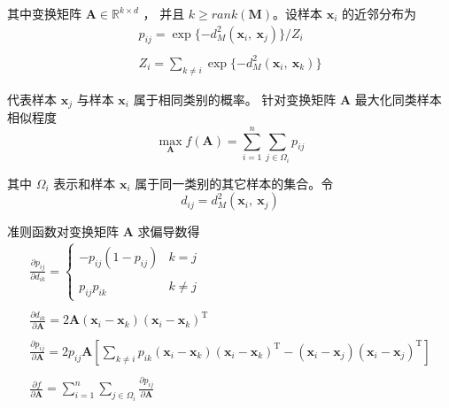 \documentclass[notitlepage]{article}
\begin{document}
其中变换矩阵 $\mathbf{A} \in \mathbb{R}^{k \times d}$ ，
并且 $k \ge rank(\mathbf{M})$。设样本 $\boldsymbol{x}_{i}$ 的近邻分布为
\begin{gather*}
    p_{ij} = \exp\{-d^{2}_{M}(\boldsymbol{x}_{i},\ 
    \boldsymbol{x}_{j})\} \bigg/ Z_{i} \\ \\
    Z_{i} = \sum_{k \ne i} 
    \exp\{ -d^{2}_{M}(\boldsymbol{x}_{i},\ \boldsymbol{x}_{k}) \}
\end{gather*}

代表样本 $\boldsymbol{x}_{j}$ 与样本 $\boldsymbol{x}_{i}$ 属于相同类别的概率。
针对变换矩阵 $\mathbf{A}$ 最大化同类样本相似程度
\begin{equation*}
    \max_{\mathbf{A}} f(\mathbf{A}) = \sum_{i = 1}^{n} 
    \sum_{j \in \Omega_{i}} p_{ij}
\end{equation*}

其中 $\Omega_{i}$ 表示和样本 $\boldsymbol{x}_{i}$ 属于同一类别的其它样本的集合。令
\begin{equation*}
    d_{ij} = d^{2}_{M}(\boldsymbol{x}_{i},\ \boldsymbol{x}_{j})
\end{equation*}

准则函数对变换矩阵 $\mathbf{A}$ 求偏导数得
\begin{gather*}
    \frac{\partial p_{ij}}{\partial d_{ik}} = \left\{
    \begin{matrix}
        -p_{ij} (1 - p_{ij}) & k = j \\ \\
        p_{ij} p_{ik} & k \ne j
    \end{matrix}
    \right. \\ \\
    \frac{\partial d_{ik}}{\partial \mathbf{A}} = 
    2\mathbf{A}(\boldsymbol{x}_{i} - \boldsymbol{x}_{k}) 
    (\boldsymbol{x}_{i} - \boldsymbol{x}_{k})^{\mathrm{T}} \\ \\
    \frac{\partial p_{ij}}{\partial \mathbf{A}} = 
    2 p_{ij} \mathbf{A} \left[ \sum_{k \ne i} p_{ik} 
    (\boldsymbol{x}_{i} - \boldsymbol{x}_{k}) 
    (\boldsymbol{x}_{i} - \boldsymbol{x}_{k})^{\mathrm{T}} - 
    (\boldsymbol{x}_{i} - \boldsymbol{x}_{j}) 
    (\boldsymbol{x}_{i} - \boldsymbol{x}_{j})^{\mathrm{T}} \right]
     \\ \\
    \frac{\partial f}{\partial \mathbf{A}} = 
    \sum_{i = 1}^{n} \sum_{j \in \Omega_{i}} 
    \frac{\partial p_{ij}}{\partial \mathbf{A}}
\end{gather*}
\end{document}
